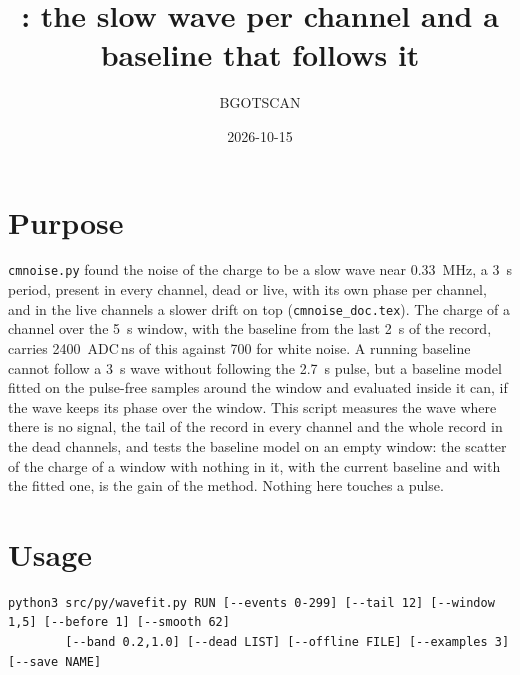 \documentclass[11pt]{article}
\title{\code{wavefit.py}: the slow wave per channel and a baseline that follows it}
\author{BGOTSCAN}
\date{2026-10-15}
\newcommand{\code}[1]{\texttt{#1}}
\newcommand{\us}{\textmu s}
\begin{document}
\maketitle

\section{Purpose}

\code{cmnoise.py} found the noise of the charge to be a slow wave near
0.33~MHz, a 3~\us{} period, present in every channel, dead or live, with
its own phase per channel, and in the live channels a slower drift on
top (\code{cmnoise\_doc.tex}). The charge of a channel over the 5~\us{}
window, with the baseline from the last 2~\us{} of the record, carries
2400~ADC\,ns of this against 700 for white noise. A running baseline
cannot follow a 3~\us{} wave without following the 2.7~\us{} pulse, but
a baseline model fitted on the pulse-free samples around the window and
evaluated inside it can, if the wave keeps its phase over the window.
This script measures the wave where there is no signal, the tail of the
record in every channel and the whole record in the dead channels, and
tests the baseline model on an empty window: the scatter of the charge of
a window with nothing in it, with the current baseline and with the
fitted one, is the gain of the method. Nothing here touches a pulse.

\section{Usage}

\begin{lstlisting}
python3 src/py/wavefit.py RUN [--events 0-299] [--tail 12] [--window 1,5] [--before 1] [--smooth 62]
        [--band 0.2,1.0] [--dead LIST] [--offline FILE] [--examples 3] [--save NAME]
\end{lstlisting}
\end{document}
